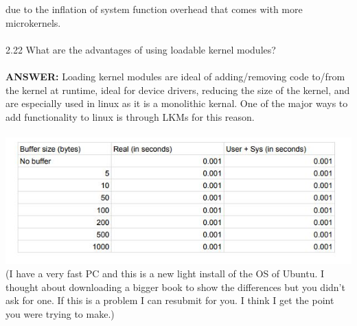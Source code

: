 \documentclass[12pt]{article}
\begin{document}
due to the inflation of system function overhead that comes with 
more microkernels.\\\\
2.22 What are the advantages of using loadable kernel modules?\\\\
\textbf{ANSWER: }Loading kernel modules are ideal of adding/removing code to/from 
the kernel at runtime, ideal for device drivers, reducing the size of 
the kernel, and are especially used in linux as it is a monolithic kernal.
One of the major ways to add functionality to linux is through LKMs for 
this reason.
\\\\
\includegraphics{table.jpg}\\
(I have a very fast PC and this is a new light install of the OS of 
Ubuntu. I thought about downloading a bigger book to show the 
differences but you didn't ask for one. If this is a problem 
I can resubmit for you. I think I get the point you were 
trying to make.)
\end{document}
